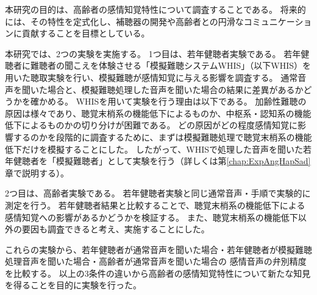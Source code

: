 本研究の目的は、高齢者の感情知覚特性について調査することである。
将来的には、その特性を定式化し、補聴器の開発や高齢者との円滑なコミュニケーションに貢献することを目標としている。

本研究では、2つの実験を実施する。
1つ目は、若年健聴者実験である。
若年健聴者に難聴者の聞こえを体験させる「模擬難聴システムWHIS」（以下WHIS）を用いた聴取実験を行い、模擬難聴が感情知覚に与える影響を調査する。
通常音声を聞いた場合と、模擬難聴処理した音声を聞いた場合の結果に差異があるかどうかを確かめる。
WHISを用いて実験を行う理由は以下である。
加齢性難聴の原因は様々であり、聴覚末梢系の機能低下によるものか、中枢系・認知系の機能低下によるものかの切り分けが困難である。
どの原因がどの程度感情知覚に影響するのかを段階的に調査するために、まずは模擬難聴処理で聴覚末梢系の機能低下だけを模擬することにした。
したがって、WHISで処理した音声を聞いた若年健聴者を「模擬難聴者」として実験を行う（詳しくは第\ref{chap:ExpAngHapSad}章で説明する）。

2つ目は、高齢者実験である。
若年健聴者実験と同じ通常音声・手順で実験的に測定を行う。
若年健聴者結果と比較することで、聴覚末梢系の機能低下による感情知覚への影響があるかどうかを検証する。
また、聴覚末梢系の機能低下以外の要因も調査できると考え、実施することにした。

これらの実験から、若年健聴者が通常音声を聞いた場合・若年健聴者が模擬難聴処理音声を聞いた場合・高齢者が通常音声を聞いた場合の
感情音声の弁別精度を比較する。
以上の3条件の違いから高齢者の感情知覚特性について新たな知見を得ることを目的に実験を行った。






